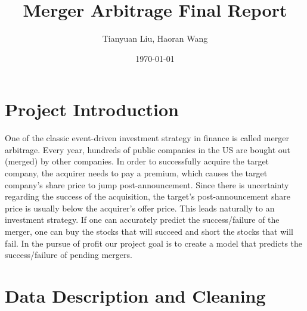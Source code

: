 \documentclass[12pt]{article}
\title{Merger Arbitrage Final Report}
\author{Tianyuan Liu, Haoran Wang}
\date{\today}
\begin{document}
\maketitle

\section{Project Introduction}
\label{sec:idea}

One of the classic event-driven investment strategy in finance is called merger arbitrage. Every year, hundreds of public companies in the US are bought out (merged) by other companies. In order to successfully acquire the target company, the acquirer needs to pay a premium, which causes the target company’s share price to jump post-announcement. Since there is uncertainty regarding the success of the acquisition, the target’s post-announcement share price is usually below the acquirer’s offer price. This leads naturally to an investment strategy. If one can accurately predict the success/failure of the merger, one can buy the stocks that will succeed and short the stocks that will fail. In the pursue of profit our project goal is to create a model that predicts the success/failure of pending mergers.

\section{Data Description and Cleaning }
\label{sec:data}
\end{document}
